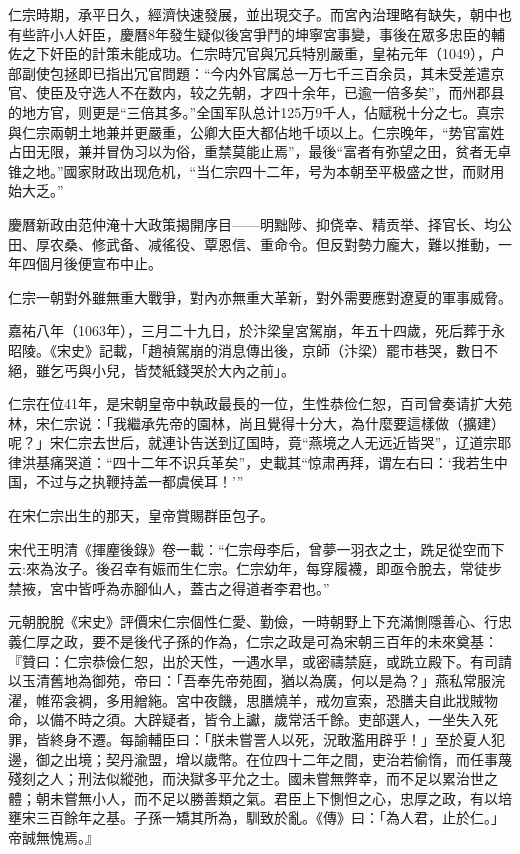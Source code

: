 仁宗時期，承平日久，經濟快速發展，並出現交子。而宮內治理略有缺失，朝中也有些許小人奸臣，慶曆8年發生疑似後宮爭鬥的坤寧宮事變，事後在眾多忠臣的輔佐之下奸臣的計策未能成功。仁宗時冗官與冗兵特別嚴重，皇祐元年（1049），户部副使包拯即已指出冗官問題：“今内外官属总一万七千三百余员，其未受差遣京官、使臣及守选人不在数内，较之先朝，才四十余年，已逾一倍多矣”，而州郡县的地方官，则更是“三倍其多。”全国军队总计125万9千人，佔赋税十分之七。真宗與仁宗兩朝土地兼并更嚴重，公卿大臣大都佔地千顷以上。仁宗晚年，“势官富姓占田无限，兼并冒伪习以为俗，重禁莫能止焉”，最後“富者有弥望之田，贫者无卓锥之地。”國家財政出现危机，“当仁宗四十二年，号为本朝至平极盛之世，而财用始大乏。”

慶曆新政由范仲淹十大政策揭開序目——明黜陟、抑侥幸、精贡举、择官长、均公田、厚农桑、修武备、减徭役、覃恩信、重命令。但反對勢力龐大，難以推動，一年四個月後便宣布中止。

仁宗一朝對外雖無重大戰爭，對內亦無重大革新，對外需要應對遼夏的軍事威脅。

嘉祐八年（1063年），三月二十九日，於汴梁皇宮駕崩，年五十四歲，死后葬于永昭陵。《宋史》記載，「趙禎駕崩的消息傳出後，京師（汴梁）罷市巷哭，數日不絕，雖乞丐與小兒，皆焚紙錢哭於大內之前」。

仁宗在位41年，是宋朝皇帝中執政最長的一位，生性恭俭仁恕，百司曾奏请扩大苑林，宋仁宗说：「我繼承先帝的園林，尚且覺得十分大，為什麼要這樣做（擴建）呢？」宋仁宗去世后，就連讣告送到辽国時，竟“燕境之人无远近皆哭”，辽道宗耶律洪基痛哭道：“四十二年不识兵革矣”，史載其“惊肃再拜，谓左右曰：‘我若生中国，不过与之执鞭持盖一都虞侯耳！’”

在宋仁宗出生的那天，皇帝賞賜群臣包子。

宋代王明清《揮麈後錄》卷一載：“仁宗母李后，曾夢一羽衣之士，跣足從空而下云:來為汝子。後召幸有娠而生仁宗。仁宗幼年，每穿履襪，即亟令脫去，常徒步禁掖，宮中皆呼為赤腳仙人，蓋古之得道者李君也。”

元朝脫脫《宋史》評價宋仁宗個性仁愛、勤儉，一時朝野上下充滿惻隱善心、行忠義仁厚之政，要不是後代子孫的作為，仁宗之政是可為宋朝三百年的未來奠基：『贊曰：仁宗恭儉仁恕，出於天性，一遇水旱，或密禱禁庭，或跣立殿下。有司請以玉清舊地為御苑，帝曰：「吾奉先帝苑囿，猶以為廣，何以是為？」燕私常服浣濯，帷帟衾裯，多用繒絁。宮中夜饑，思膳燒羊，戒勿宣索，恐膳夫自此戕賊物命，以備不時之須。大辟疑者，皆令上讞，歲常活千餘。吏部選人，一坐失入死罪，皆終身不遷。每諭輔臣曰：「朕未嘗詈人以死，況敢濫用辟乎！」至於夏人犯邊，御之出境；契丹渝盟，增以歲幣。在位四十二年之間，吏治若偷惰，而任事蔑殘刻之人；刑法似縱弛，而決獄多平允之士。國未嘗無弊幸，而不足以累治世之體；朝未嘗無小人，而不足以勝善類之氣。君臣上下惻怛之心，忠厚之政，有以培壅宋三百餘年之基。子孫一矯其所為，馴致於亂。《傳》曰：「為人君，止於仁。」帝誠無愧焉。』

